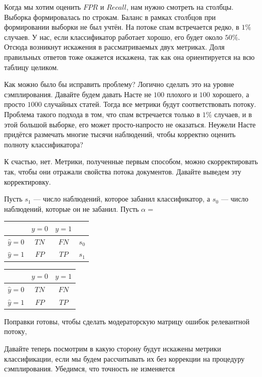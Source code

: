 \documentclass[12pt, a4paper, oneside]{article}
\begin{document}
Когда мы хотим оценить $FPR$ и $Recall$, нам нужно смотреть на столбцы. Выборка формировалась по строкам. Баланс в рамках столбцов при формировании выборки не был учтён. На потоке спам встречается редко, в $1\%$ случаев. У нас, если классификатор работает хорошо, его будет около $50\%$. Отсюда возникнут искажения в рассматриваемых двух метриках. Доля правильных ответов тоже окажется искажена, так как она ориентируется на всю таблицу целиком. 

Как можно было бы исправить проблему? Логично сделать это на уровне сэмплирования. Давайте будем давать Насте не $100$ плохого и $100$ хорошего, а просто $1000$ случайных статей. Тогда все метрики будут соответствовать потоку. Проблема такого подхода в том, что спам встречается только в $1\%$ случаев, и в этой большой выборке, его может просто-напросто не оказаться. Неужели Насте придётся размечать многие тысячи наблюдений, чтобы корректно оценить полноту классификатора?  

К счастью, нет. Метрики, полученные первым способом, можно скорректировать так, чтобы они отражали свойства потока документов. Давайте выведем эту корректировку. 

Пусть $s_1$ --- число наблюдений, которое забанил классификатор, а $s_0$ --- число наблюдений, которые он не забанил. Пусть $\alpha = $

\begin{center}
	\begin{tabular}{|c|c|c|c}
		\hline
		& $y=0$  &  $ y = 1$ & \\  \hline 
		$\hat y = 0$ & $TN$ & $FN$ & $s_0$\\ \hline 
		$\hat y = 1$ & $FP$ & $TP$ & $s_1$\\ \hline
	\end{tabular} \hspace{2cm}	\begin{tabular}{|c|c|c|}
		\hline
		& $y=0$  &  $ y = 1$ \\  \hline 
		$\hat y = 0$ & $TN$ & $FN$ \\ \hline 
		$\hat y = 1$ & $FP$ & $TP$ \\ \hline
	\end{tabular}
\end{center}



Поправки готовы, чтобы сделать модераторскую матрицу ошибок релевантной потоку,


Давайте теперь посмотрим в какую сторону будут искажены метрики классификации, если мы будем рассчитывать их без коррекции на процедуру сэмплирования. Убедимся, что точность не изменяется
\end{document}
